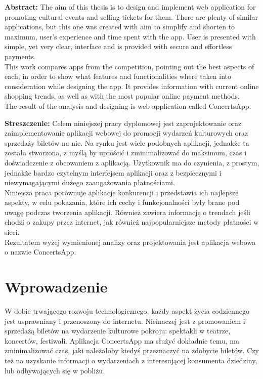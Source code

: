 \documentclass[12pt]{article}
\begin{document}
\begin{sloppypar}


\tableofcontents
\newpage

\textbf{Abstract:}
The aim of this thesis is to design and implement web application for promoting cultural events and selling tickets for them. 
There are plenty of similar applications, but this one was created with aim to simplify and shorten to maximum, user's experience and time spent with the app.
User is presented with simple, yet very clear, interface and is provided with secure and effortless payments. \\
This work compares apps from the competition, pointing out the best aspects of each, in order to show what features and functionalities where taken into 
consideration while designing the app. It provides information with current online shopping trends, as well as
with the most popular online payment methods.\\
The result of the analysis and designing is web application called ConcertsApp.

\bigbreak
\textbf{Streszczenie:}
Celem niniejszej pracy dyplomowej jest zaprojektowanie oraz zaimplementowanie aplikacji webowej do promocji wydarzeń kulturowych oraz sprzedaży biletów na nie.
Na rynku jest wiele podobnych aplikacji, jednakże ta została stworzona, z myślą by uprościć i zminimalizować do maksimum, 
czas i doświadczenie z obcowaniem z aplikacją.
Użytkownik ma do czynienia, z prostym, jednakże bardzo czytelnym interfejsem aplikacji oraz z bezpiecznymi i niewymagającymi 
dużego zaangażowania płatnościami.\\
Niniejsza praca porównuje aplikacje konkurencji i przedstawia ich najlepsze aspekty, 
w celu pokazania, które ich cechy i funkcjonalności były brane pod uwagę podczas tworzenia aplikacji. 
Również zawiera informację o trendach jeśli chodzi o zakupy przez internet, jak również najpopularniejsze metody płatności w sieci.\\
Rezultatem wyżej wymienionej analizy oraz projektowania jest aplikacja webowa o nazwie ConcertsApp.

\clearpage
\section{Wprowadzenie}
{
  W dobie trwającego rozwoju technologicznego, każdy aspekt życia codziennego jest usprawniany i przenoszony
  do internetu. Nieinaczej jest z promowaniem i sprzedażą biletów na wydarzenie kulturowe pokroju:
  spektakli w teatrze, koncertów, festiwali. Aplikacja ConcertsApp ma służyć dokładnie temu,
  ma zminimalizować czas, jaki należałoby kiedyś przeznaczyć na zdobycie biletów. Czy też na uzyskanie
  informacji o wydarzeniach z interesującej konsumenta dziedziny, lub odbywających się w pobliżu.
}
\end{sloppypar}
\end{document}
